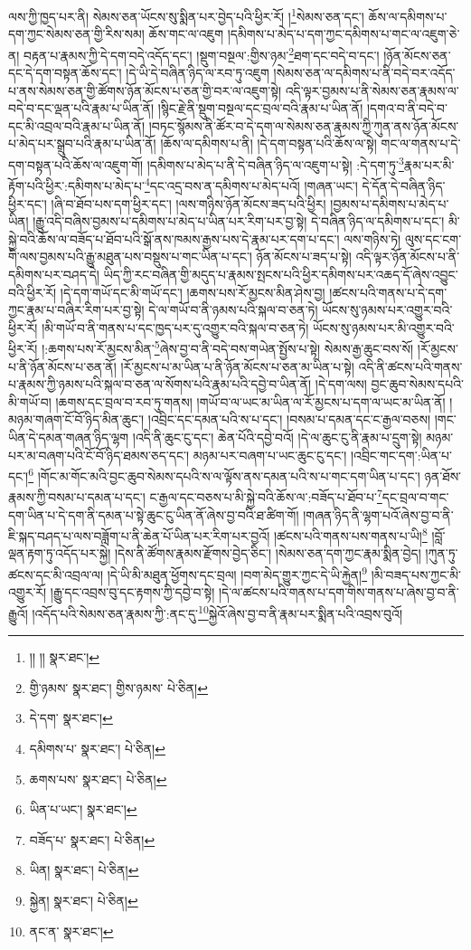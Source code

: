 ལས་ཀྱི་ཁྱད་པར་ནི། སེམས་ཅན་ཡོངས་སུ་སྨིན་པར་བྱེད་པའི་ཕྱིར་རོ། །\footnote{།། །།  སྣར་ཐང་། }སེམས་ཅན་དང་། ཆོས་ལ་དམིགས་པ་དག་ཀྱང་སེམས་ཅན་གྱི་རིས་སམ། ཆོས་གང་ལ་འཇུག །དམིགས་པ་མེད་པ་དག་ཀྱང་དམིགས་པ་གང་ལ་འཇུག་ཅེ་ན། བརྟན་པ་རྣམས་ཀྱི་དེ་དག་བདེ་འདོད་དང་། །སྡུག་བསྔལ་:གྱིས་ཉམ་\footnote{གྱི་ཉམས་  སྣར་ཐང་། གྱིས་ཉམས་  པེ་ཅིན། }ཐག་དང་བདེ་བ་དང་། །ཉོན་མོངས་ཅན་དང་དེ་དག་བསྟན་ཆོས་དང་། །དེ་ཡི་དེ་བཞིན་ཉིད་ལ་རབ་ཏུ་འཇུག །སེམས་ཅན་ལ་དམིགས་པ་ནི་བདེ་བར་འདོད་པ་ནས་སེམས་ཅན་གྱི་ཚོགས་ཉོན་མོངས་པ་ཅན་གྱི་བར་ལ་འཇུག་སྟེ། འདི་ལྟར་བྱམས་པ་ནི་སེམས་ཅན་རྣམས་ལ་བདེ་བ་དང་ལྡན་པའི་རྣམ་པ་ཡིན་ནོ། །སྙིང་རྗེ་ནི་སྡུག་བསྔལ་དང་བྲལ་བའི་རྣམ་པ་ཡིན་ནོ། །དགའ་བ་ནི་བདེ་བ་དང་མི་འབྲལ་བའི་རྣམ་པ་ཡིན་ནོ། །བཏང་སྙོམས་ནི་ཚོར་བ་དེ་དག་ལ་སེམས་ཅན་རྣམས་ཀྱི་ཀུན་ནས་ཉོན་མོངས་པ་མེད་པར་སྒྲུབ་པའི་རྣམ་པ་ཡིན་ནོ། །ཆོས་ལ་དམིགས་པ་ནི། །དེ་དག་བསྟན་པའི་ཆོས་ལ་སྟེ། གང་ལ་གནས་པ་དེ་དག་བསྟན་པའི་ཆོས་ལ་འཇུག་གོ། །དམིགས་པ་མེད་པ་ནི་དེ་བཞིན་ཉིད་ལ་འཇུག་པ་སྟེ། :དེ་དག་ཏུ་\footnote{དེ་དག་  སྣར་ཐང་། }རྣམ་པར་མི་རྟོག་པའི་ཕྱིར་:དམིགས་པ་མེད་པ་\footnote{དམིགས་པ་  སྣར་ཐང་།  པེ་ཅིན། }དང་འདྲ་བས་ན་དམིགས་པ་མེད་པའོ། །གཞན་ཡང་། དེ་དོན་དེ་བཞིན་ཉིད་ཕྱིར་དང་། །ཞི་བ་ཐོབ་པས་དག་ཕྱིར་དང་། །ལས་གཉིས་ཉོན་མོངས་ཟད་པའི་ཕྱིར། །བྱམས་པ་དམིགས་པ་མེད་པ་ཡིན། །རྒྱུ་འདི་བཞིས་བྱམས་པ་དམིགས་པ་མེད་པ་ཡིན་པར་རིག་པར་བྱ་སྟེ། དེ་བཞིན་ཉིད་ལ་དམིགས་པ་དང་། མི་སྐྱེ་བའི་ཆོས་ལ་བཟོད་པ་ཐོབ་པའི་སྒོ་ནས་ཁམས་རྒྱས་པས་དེ་རྣམ་པར་དག་པ་དང་། ལས་གཉིས་ཏེ། ལུས་དང་ངག་གི་ལས་བྱམས་པའི་རྒྱུ་མཐུན་པས་བསྡུས་པ་གང་ཡིན་པ་དང་། ཉོན་མོངས་པ་ཟད་པ་སྟེ། འདི་ལྟར་ཉོན་མོངས་པ་ནི་དམིགས་པར་བཤད་དེ། ཡིད་ཀྱི་རང་བཞིན་གྱི་མདུད་པ་རྣམས་སྤངས་པའི་ཕྱིར་དམིགས་པར་འཆད་དོ་ཞེས་འབྱུང་བའི་ཕྱིར་རོ། །དེ་དག་གཡོ་དང་མི་གཡོ་དང་། །ཆགས་པས་རོ་མྱངས་མིན་ཤེས་བྱ། །ཚངས་པའི་གནས་པ་དེ་དག་ཀྱང་རྣམ་པ་བཞིར་རིག་པར་བྱ་སྟེ། དེ་ལ་གཡོ་བ་ནི་ཉམས་པའི་སྐལ་བ་ཅན་ཏེ། ཡོངས་སུ་ཉམས་པར་འགྱུར་བའི་ཕྱིར་རོ། །མི་གཡོ་བ་ནི་གནས་པ་དང་ཁྱད་པར་དུ་འགྱུར་བའི་སྐལ་བ་ཅན་ཏེ། ཡོངས་སུ་ཉམས་པར་མི་འགྱུར་བའི་ཕྱིར་རོ། །:ཆགས་པས་རོ་མྱངས་མིན་\footnote{ཆགས་པས་  སྣར་ཐང་།  པེ་ཅིན། }ཞེས་བྱ་བ་ནི་བདེ་བས་གཡེན་སྤྱོས་པ་སྟེ། སེམས་རྒྱ་ཆུང་བས་སོ། །རོ་མྱངས་པ་ནི་ཉོན་མོངས་པ་ཅན་ནོ། །རོ་མྱངས་པ་མ་ཡིན་པ་ནི་ཉོན་མོངས་པ་ཅན་མ་ཡིན་པ་སྟེ། འདི་ནི་ཚངས་པའི་གནས་པ་རྣམས་ཀྱི་ཉམས་པའི་སྐལ་བ་ཅན་ལ་སོགས་པའི་རྣམ་པའི་དབྱེ་བ་ཡིན་ནོ། །དེ་དག་ལས། བྱང་ཆུབ་སེམས་དཔའི་མི་གཡོ་བ། །ཆགས་དང་བྲལ་བ་རབ་ཏུ་གནས། །གཡོ་བ་ལ་ཡང་མ་ཡིན་ལ་རོ་མྱངས་པ་དག་ལ་ཡང་མ་ཡིན་ནོ། །མཉམ་གཞག་ངོ་བོ་ཉིད་མིན་ཆུང་། །འབྲིང་དང་དམན་པའི་ས་པ་དང་། །བསམ་པ་དམན་དང་ང་རྒྱལ་བཅས། །གང་ཡིན་དེ་དམན་གཞན་ཉིད་ལྷག །འདི་ནི་ཆུང་ངུ་དང་། ཆེན་པོའི་དབྱེ་བའོ། །དེ་ལ་ཆུང་ངུ་ནི་རྣམ་པ་དྲུག་སྟེ། མཉམ་པར་མ་བཞག་པའི་ངོ་བོ་ཉིད་ཐམས་ཅད་དང་། མཉམ་པར་བཞག་པ་ཡང་ཆུང་ངུ་དང་། །འབྲིང་གང་དག་:ཡིན་པ་དང་།\footnote{ཡིན་པ་ཡང་།  སྣར་ཐང་། } །གོང་མ་གོང་མའི་བྱང་ཆུབ་སེམས་དཔའི་ས་ལ་ལྟོས་ནས་དམན་པའི་ས་པ་གང་དག་ཡིན་པ་དང་། ཉན་ཐོས་རྣམས་ཀྱི་བསམ་པ་དམན་པ་དང་། ང་རྒྱལ་དང་བཅས་པ་མི་སྐྱེ་བའི་ཆོས་ལ་:བཟོད་པ་ཐོབ་པ་\footnote{བཟོད་པ་  སྣར་ཐང་།  པེ་ཅིན། }དང་བྲལ་བ་གང་དག་ཡིན་པ་དེ་དག་ནི་དམན་པ་སྟེ་ཆུང་ངུ་ཡིན་ནོ་ཞེས་བྱ་བའི་ཐ་ཚིག་གོ། །གཞན་ཉིད་ནི་ལྷག་པའོ་ཞེས་བྱ་བ་ནི་ཇི་སྐད་བཤད་པ་ལས་བཟློག་པ་ནི་ཆེན་པོ་ཡིན་པར་རིག་པར་བྱའོ། །ཚངས་པའི་གནས་པས་གནས་པ་ཡི།\footnote{ཡིན།  སྣར་ཐང་།  པེ་ཅིན། } །བློ་ལྡན་རྟག་ཏུ་འདོད་པར་སྐྱེ། །དེས་ནི་ཚོགས་རྣམས་རྫོགས་བྱེད་ཅིང་། །སེམས་ཅན་དག་ཀྱང་རྣམ་སྨིན་བྱེད། །ཀུན་ཏུ་ཚངས་དང་མི་འབྲལ་ལ། །དེ་ཡི་མི་མཐུན་ཕྱོགས་དང་བྲལ། །བག་མེད་གྱུར་ཀྱང་དེ་ཡི་རྐྱེན།\footnote{སྐྱེན།  སྣར་ཐང་།  པེ་ཅིན། } །མི་བཟད་པས་ཀྱང་མི་འགྱུར་རོ། །རྒྱུ་དང་འབྲས་བུ་དང་རྟགས་ཀྱི་དབྱེ་བ་སྟེ། །དེ་ལ་ཚངས་པའི་གནས་པ་དག་གིས་གནས་པ་ཞེས་བྱ་བ་ནི་རྒྱུའོ། །འདོད་པའི་སེམས་ཅན་རྣམས་ཀྱི་:ནང་དུ་\footnote{ནང་ན་  སྣར་ཐང་། }སྐྱེའོ་ཞེས་བྱ་བ་ནི་རྣམ་པར་སྨིན་པའི་འབྲས་བུའོ། 